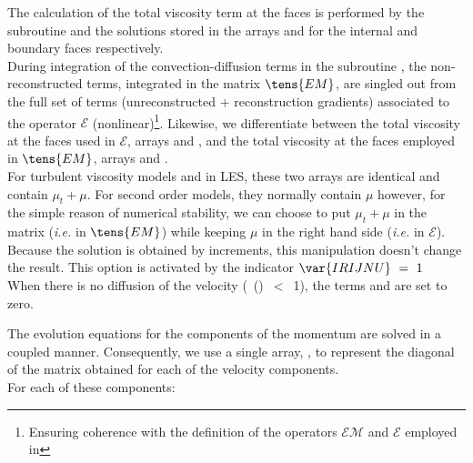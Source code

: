 The calculation of the total viscosity term at the faces is performed by the subroutine  and the solutions stored in the arrays  and  for the internal and boundary faces respectively.\\
During integration of the convection-diffusion terms in the subroutine , the non-reconstructed terms, integrated in the matrix $\tens{EM}$, are singled out from the full set of terms (unreconstructed +
reconstruction gradients) associated to the operator $\mathcal{E}$ (nonlinear)\footnote{ Ensuring coherence with the definition of the operators $\mathcal{EM}$ and $\mathcal{E}$ employed in  }.
Likewise, we differentiate between the total viscosity at the faces used in $\mathcal{E}$, arrays  and , and the total viscosity at the faces employed in $\tens{EM}$, arrays  and .\\
For turbulent viscosity models and in LES, these two arrays are identical and contain $\mu_t+\mu$.
For second order models, they normally contain $\mu$ however, for the simple reason of numerical stability, we can choose to put $\mu_t+\mu$ in the matrix (\textit{i.e.} in $\tens{EM}$) while keeping $\mu$ in the right hand side (\textit{i.e.} in $\mathcal{E}$). Because the solution is obtained by increments, this manipulation doesn't change the result. This option is activated by the indicator $\var{IRIJNU}\ =\ 1$\\
When there is no diffusion of the velocity (\ ()\ $<$\ 1), the terms  and  are set to zero.
\linebreak

The evolution equations for the components of the momentum are solved in a coupled manner. Consequently, we use a single array, , to represent the diagonal of the matrix obtained for each of the velocity components.\\
For each of these components:\\

